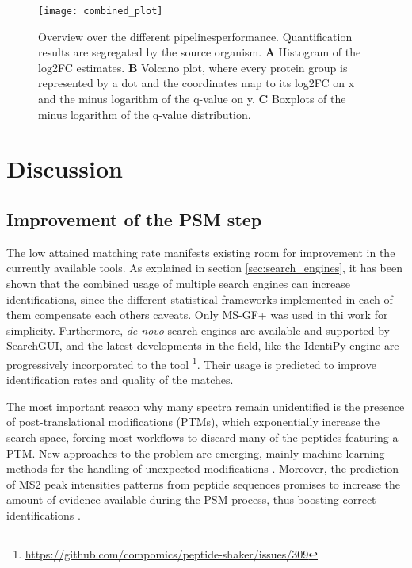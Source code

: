 \begin{figure}[H]
\centering
\texttt{[image: combined\_plot]}
\caption[Pipelines performance]{Overview over the different pipelines\textquotesingle performance. Quantification results are segregated by the source organism. \textbf{A} Histogram of the \ac{log2FC} estimates. \textbf{B} Volcano plot, where every protein group is represented by a dot and the coordinates map to its \ac{log2FC} on x and the minus logarithm of the q-value on y. \textbf{C} Boxplots of the minus logarithm of the q-value distribution.}
\label{fig:combined_plot}
\end{figure}



\section{Discussion}

\subsection{Improvement of the PSM step}

The low attained matching rate manifests existing room for improvement in the currently available tools. As explained in section \ref{sec:search_engines}, it has been shown that the combined usage of multiple search engines can increase identifications, since the different statistical frameworks implemented in each of them compensate each other\textquotesingle s caveats. Only MS-GF+ was used in thi work for simplicity. Furthermore, \textit{de novo} search engines are available and supported by SearchGUI, and the latest developments in the field, like the IdentiPy engine \cite{Levitsky2018} are progressively incorporated to the tool \footnote{\href{https://github.com/compomics/peptide-shaker/issues/309}{https://github.com/compomics/peptide-shaker/issues/309}}. Their usage is predicted to improve identification rates and quality of the matches.

The most important reason why many spectra remain unidentified is the presence of post-translational modifications (\ac{PTM}s), which exponentially increase the search space, forcing most workflows to discard many of the peptides featuring a PTM. New approaches to the problem are emerging, mainly machine learning methods for the handling of unexpected modifications \cite{Gabriels}. Moreover, the prediction of \ac{MS2} peak intensities patterns from peptide sequences promises to increase the amount of evidence available during the PSM process, thus boosting correct identifications \cite{Kirik2018} \cite{Degroeve2013}.

